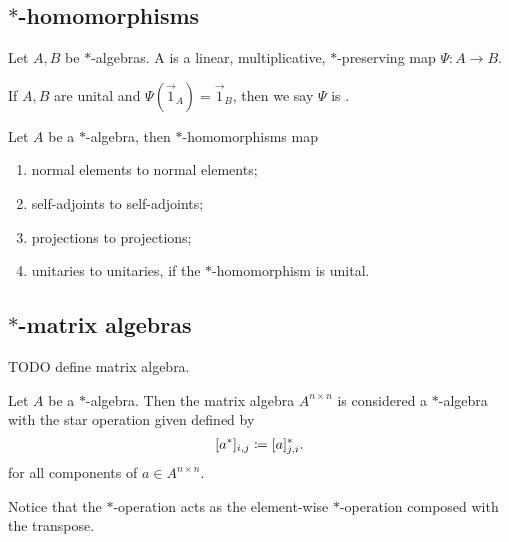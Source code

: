 \subsection{$*$-homomorphisms}
\begin{definition}
Let $A,B$ be $*$-algebras. A  is a linear, multiplicative, $*$-preserving map $\Psi: A \to B$.

If $A,B$ are unital and $\Psi(\vec{1}_A) = \vec{1}_B$, then we say $\Psi$ is .
\end{definition}
\begin{lemma}
Let $A$ be a $*$-algebra, then $*$-homomorphisms map
\begin{enumerate}
\item normal elements to normal elements;
\item self-adjoints to self-adjoints;
\item projections to projections;
\item unitaries to unitaries, if the $*$-homomorphism is unital.
\end{enumerate}
\end{lemma}

\subsection{$*$-matrix algebras}
TODO define matrix algebra.
\begin{definition}
Let $A$ be a $*$-algebra. Then the matrix algebra $A^{n\times n}$ is considered a $*$-algebra with the star operation given defined by
\[ [a^*]_{i,j} \coloneqq [a]_{j,i}^*. \]
for all components of $a\in A^{n\times n}$.
\end{definition}
Notice that the $*$-operation acts as the element-wise $*$-operation composed with the transpose.

